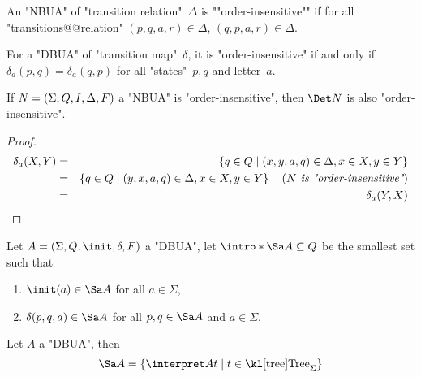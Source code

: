 \documentclass{article}
\begin{document}
\begin{definition}
	An "NBUA" of "transition relation"~$\Delta$ is ""order-insensitive"" if for all "transitions@@relation" $(p,q,a,r) \in \Delta$,
	$(q,p,a,r) \in \Delta$.
\end{definition}

\begin{remark}
	For a "DBUA" of "transition map"~$\delta$, it is "order-insensitive" if and only if
	$\delta_a (p,q) = \delta_a (q,p)$ for all "states"~$p,q$ and letter~$a$.
\end{remark}

\begin{lemma}
	If $N = (\Sigma, Q, I, \Delta, F)$ a "NBUA" is "order-insensitive", then $\Det N$ is also "order-insensitive".
\end{lemma}

\begin{proof}
	\begin{eqnarray*}
		\delta_a (X,Y) &=& \left\{q \in Q \mid (x,y,a,q) \in \Delta, x \in X, y \in Y\right\} \\
		&=& \left\{q \in Q \mid (y,x,a,q) \in \Delta, x \in X, y \in Y\right\}  \quad\left(\textit{$N$ is "order-insensitive"}\right) \\
		&=& \delta_a (Y,X)
	\end{eqnarray*}
\end{proof}

\begin{definition}
	Let $A = \DBUA$ a "DBUA", let $\intro* \Sa A \subseteq Q$ be the smallest set such that
	\begin{enumerate}
		\item $\init (a) \in \Sa A$ for all $a \in \Sigma$,
		\item $\delta (p,q,a) \in \Sa A$ for all $p,q \in \Sa A$ and $a \in \Sigma$.
	\end{enumerate}
\end{definition}


\begin{lemma}
	Let $A$ a "DBUA", then
	\[\Sa A = \setdef {\interpret A t} {t \in \tree_\Sigma} \]
\end{lemma}
\end{document}
